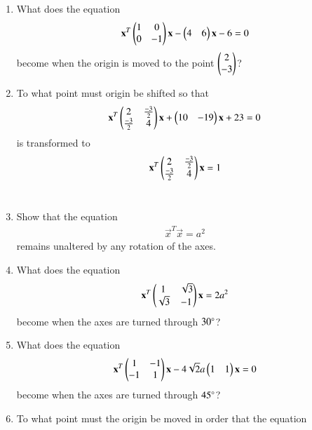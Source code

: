 \renewcommand{\theequation}{\theenumi}
\begin{enumerate}[label=\arabic*.,ref=\thesubsection.\theenumi]
\item What does the equation 
\begin{align}
\mathbf{x}^T\begin{pmatrix}1 & 0\\0 & -1\end{pmatrix}\mathbf{x}-\begin{pmatrix}4 & 6\end{pmatrix}\mathbf{x}-6=0
\end{align}
become when the origin is moved to the point $\begin{pmatrix}2\\-3\end{pmatrix}$?
\\
\solution

\item To what point must origin be shifted so that
\begin{align}\label{eq:solutions/3/4/2/eq12}
\mathbf{x}^T\begin{pmatrix}2 & \frac{-3}{2}\\\frac{-3}{2}& 4\end{pmatrix}\mathbf{x}+\begin{pmatrix} 10& -19\end{pmatrix}\mathbf{x}+23=0
\end{align}
is transformed to 
\begin{align}\label{eq:solutions/3/4/2/eq11}
\mathbf{x}^T\begin{pmatrix}2 & \frac{-3}{2}\\\frac{-3}{2}& 4\end{pmatrix}\mathbf{x}=1
\end{align}
\\
\solution

\item Show that the equation
\begin{align}
\vec{x}^T\vec{x}= a^2
\end{align}
remains unaltered by any rotation of the axes.
\item What does the equation
\begin{align}
\mathbf{x}^T\begin{pmatrix}1 & \sqrt{3}\\ \sqrt{3} & -1\end{pmatrix}\mathbf{x} = 2a^2
\label{eq:solutions/3/4/4/eq:given}
\end{align}
become when the axes are turned through $30\degree$?
\\
\solution

\item What does the equation
\begin{align}
\mathbf{x}^T\begin{pmatrix}1 & -1\\-1 & 1\end{pmatrix}\mathbf{x}-4\sqrt{2}a\begin{pmatrix}1 & 1\end{pmatrix}\mathbf{x}=0
\end{align}
become when the axes are turned through $45\degree$?
\\
\solution
%
\item To what point must the origin be moved in order that the equation
\begin{align}

\end{align}
\end{enumerate}
